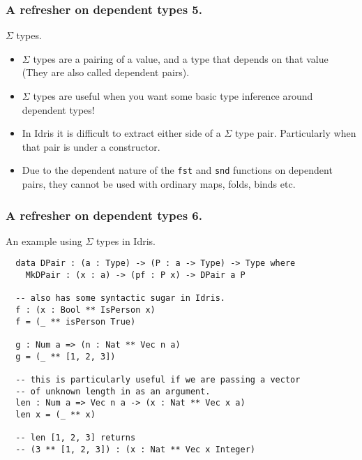 \documentclass{beamer}
\begin{document}
\begin{frame}[fragile]
  \frametitle{A refresher on dependent types 5.}
  \begin{block}{$\Sigma$ types.}
  \begin{itemize}
    \item $\Sigma$ types are a pairing of a value, and a type that
            depends on that value (They are also called dependent
                  pairs).
    \item $\Sigma$ types are useful when you want some basic type
            inference around dependent types!
    \item In Idris it is difficult to extract either side of a $\Sigma$
          type pair. Particularly when that pair is under a
          constructor.
    \item Due to the dependent nature of the
            \texttt{fst} and \texttt{snd}
            functions on dependent pairs, they cannot be used with
            ordinary maps, folds, binds etc.
  \end{itemize}
  \end{block}
\end{frame}

\begin{frame}[fragile]
  \frametitle{A refresher on dependent types 6.}
  \begin{block}{An example using $\Sigma$ types in Idris.}
  \begin{verbatim}
  data DPair : (a : Type) -> (P : a -> Type) -> Type where
    MkDPair : (x : a) -> (pf : P x) -> DPair a P

  -- also has some syntactic sugar in Idris.
  f : (x : Bool ** IsPerson x)
  f = (_ ** isPerson True)

  g : Num a => (n : Nat ** Vec n a)
  g = (_ ** [1, 2, 3])

  -- this is particularly useful if we are passing a vector
  -- of unknown length in as an argument.
  len : Num a => Vec n a -> (x : Nat ** Vec x a)
  len x = (_ ** x)

  -- len [1, 2, 3] returns
  -- (3 ** [1, 2, 3]) : (x : Nat ** Vec x Integer)
  \end{verbatim}
  \end{block}
\end{frame}
\end{document}
